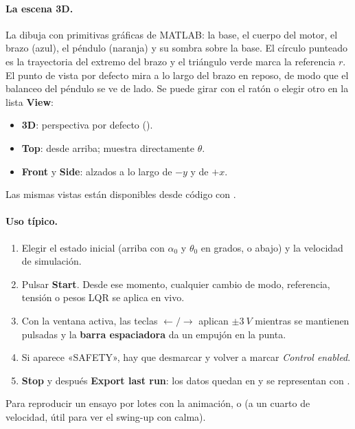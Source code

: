 \paragraph{La escena 3D.} La dibuja  con primitivas gráficas de MATLAB: la base, el cuerpo del motor, el brazo (azul), el péndulo (naranja) y su sombra sobre la base. El círculo punteado es la trayectoria del extremo del brazo y el triángulo verde marca la referencia $r$. El punto de vista por defecto mira a lo largo del brazo en reposo, de modo que el balanceo del péndulo se ve de lado. Se puede girar con el ratón o elegir otro en la lista \textbf{View}:
\begin{itemize}
  \item \textbf{3D}: perspectiva por defecto ().
  \item \textbf{Top}: desde arriba; muestra directamente $\theta$.
  \item \textbf{Front} y \textbf{Side}: alzados a lo largo de $-y$ y de $+x$.
\end{itemize}
Las mismas vistas están disponibles desde código con .

\paragraph{Uso típico.}
\begin{enumerate}
  \item Elegir el estado inicial (arriba con $\alpha_0$ y $\theta_0$ en grados, o abajo) y la velocidad de simulación.
  \item Pulsar \textbf{Start}. Desde ese momento, cualquier cambio de modo, referencia, tensión o pesos LQR se aplica en vivo.
  \item Con la ventana activa, las teclas $\leftarrow/\rightarrow$ aplican $\pm\SI{3}{V}$ mientras se mantienen pulsadas y la \textbf{barra espaciadora} da un empujón en la punta.
  \item Si aparece «SAFETY», hay que desmarcar y volver a marcar \emph{Control enabled}.
  \item \textbf{Stop} y después \textbf{Export last run}: los datos quedan en  y se representan con .
\end{enumerate}

\begin{nota}
Para reproducir un ensayo por lotes con la animación,  o  (a un cuarto de velocidad, útil para ver el swing-up con calma).
\end{nota}
